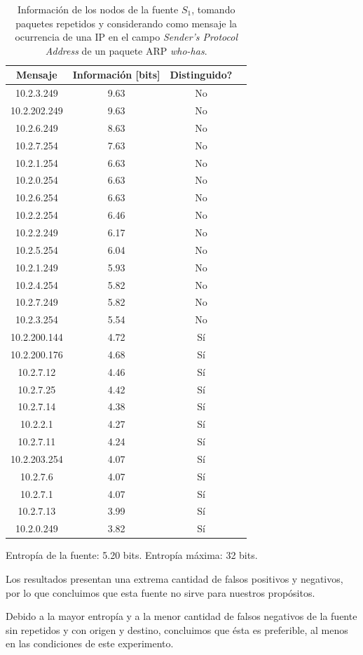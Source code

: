 \begin{table}[t]
    \centering
    \begin{tabular}{ | c | c | c | l |}
        \hline
        Mensaje & Información [bits] & Distinguido?\\
\hline
10.2.3.249 & 9.63 & No \\
\hline
10.2.202.249 & 9.63 & No \\
\hline
10.2.6.249 & 8.63 & No \\
\hline
10.2.7.254 & 7.63 & No \\
\hline
10.2.1.254 & 6.63 & No \\
\hline
10.2.0.254 & 6.63 & No \\
\hline
10.2.6.254 & 6.63 & No \\
\hline
10.2.2.254 & 6.46 & No \\
\hline
10.2.2.249 & 6.17 & No \\
\hline
10.2.5.254 & 6.04 & No \\
\hline
10.2.1.249 & 5.93 & No \\
\hline
10.2.4.254 & 5.82 & No \\
\hline
10.2.7.249 & 5.82 & No \\
\hline
10.2.3.254 & 5.54 & No \\
\hline
10.2.200.144 & 4.72 & Sí \\
\hline
10.2.200.176 & 4.68 & Sí \\
\hline
10.2.7.12 & 4.46 & Sí \\
\hline
10.2.7.25 & 4.42 & Sí \\
\hline
10.2.7.14 & 4.38 & Sí \\
\hline
10.2.2.1 & 4.27 & Sí \\
\hline
10.2.7.11 & 4.24 & Sí \\
\hline
10.2.203.254 & 4.07 & Sí \\
\hline
10.2.7.6 & 4.07 & Sí \\
\hline
10.2.7.1 & 4.07 & Sí \\
\hline
10.2.7.13 & 3.99 & Sí \\
\hline
10.2.0.249 & 3.82 & Sí \\
\hline
    \end{tabular} 
    \caption{Información de los nodos de la fuente $S_1$, tomando paquetes repetidos y considerando como mensaje la ocurrencia de una IP en el campo \textit{Sender's Protocol Address} de un paquete ARP \textit{who-has}.}
    \label{tab1R}
\end{table} 

\par Entropía de la fuente: 5.20 bits. Entropía máxima: 32 bits.

\par Los resultados presentan una extrema cantidad de falsos positivos y negativos, por lo que concluimos que esta fuente no sirve para nuestros propósitos.

\par Debido a la mayor entropía y a la menor cantidad de falsos negativos de la fuente sin repetidos y con origen y destino, concluimos que ésta es preferible, al menos en las condiciones de este experimento.
